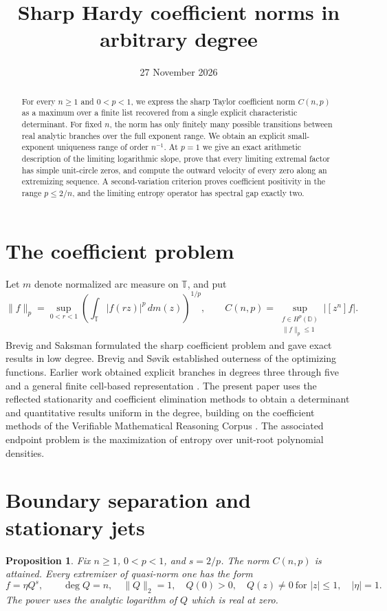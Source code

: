 \documentclass[11pt]{article}
\title{Sharp Hardy coefficient norms in arbitrary degree}
\author{}
\date{27 November 2026}
\newtheorem{proposition}[theorem]{Proposition}
\newcommand{\D}{\mathbb D}
\newcommand{\T}{\mathbb T}
\begin{document}
\maketitle
\begin{abstract}
For every \(n\geq1\) and \(0<p<1\), we express the sharp
Taylor coefficient norm \(C(n,p)\) as a maximum over a finite
list recovered from a single explicit characteristic determinant.
For fixed \(n\), the norm has only finitely many possible
transitions between real analytic branches over the full
exponent range. We obtain an explicit small-exponent uniqueness
range of order \(n^{-1}\). At \(p=1\) we give an exact arithmetic
description of the limiting logarithmic slope, prove that every
limiting extremal factor has simple unit-circle zeros, and
compute the outward velocity of every zero along an extremizing
sequence. A second-variation criterion proves coefficient positivity
in the range \(p\le2/n\), and the limiting entropy operator has
spectral gap exactly two.
\end{abstract}

\section{The coefficient problem}

Let \(m\) denote normalized arc measure on \(\T\), and put
\[
 \|f\|_p=\sup_{0<r<1}\left(\int_\T|f(rz)|^p\,dm(z)\right)^{1/p},
 \qquad
 C(n,p)=\sup_{\substack{f\in H^p(\D)\\\|f\|_p\leq1}}|[z^n]f|.
\]
Brevig and Saksman \cite{BrevigSaksman} formulated the sharp
coefficient problem and gave exact results in low degree.
Brevig and S{\o}vik \cite{BrevigSovik} established outerness
of the optimizing functions. Earlier work obtained explicit
branches in degrees three through five and a general finite
cell-based representation \cite{Low,High,Fifth}. The present
paper uses the reflected stationarity and coefficient
elimination methods to obtain a determinant and quantitative
results uniform in the degree, building on the coefficient methods
of the Verifiable Mathematical Reasoning Corpus \cite{VMRC}. The associated endpoint problem
is the maximization of entropy over unit-root polynomial
densities.

\section{Boundary separation and stationary jets}

\begin{proposition}\label{prop:boundary}
Fix \(n\ge1\), \(0<p<1\), and \(s=2/p\). The norm \(C(n,p)\)
is attained. Every extremizer of quasi-norm one has the form
\[
 f=\eta Q^s,\qquad
 \deg Q=n,\quad \|Q\|_2=1,\quad Q(0)>0,\quad
 Q(z)\ne0\ \text{for }|z|\le1,\quad |\eta|=1 .
\]
The power uses the analytic logarithm of \(Q\) which is real at zero.
\end{proposition}
\end{document}
